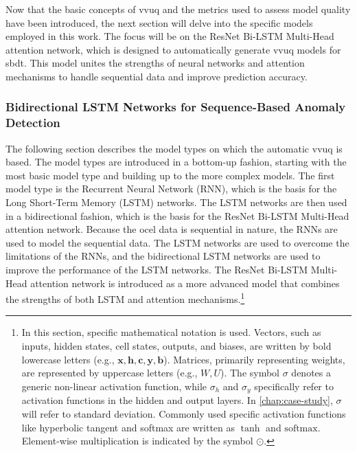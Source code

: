 Now that the basic concepts of \gls{vvuq} and the metrics used to assess model quality have been introduced, the next section will delve into the specific models employed in this work. The focus will be on the ResNet Bi-LSTM Multi-Head attention network, which is designed to automatically generate \gls{vvuq} models for \gls{sbdt}. This model unites the strengths of neural networks and attention mechanisms to handle sequential data and improve prediction accuracy.

\subsubsection*{Bidirectional LSTM Networks for Sequence-Based Anomaly Detection}

The following section describes the model types on which the automatic \gls{vvuq} is based. The model types are introduced in a bottom-up fashion, starting with the most basic model type and building up to the more complex models.
The first model type is the Recurrent Neural Network (RNN), which is the basis for the Long Short-Term Memory (LSTM) networks. The LSTM networks are then used in a bidirectional fashion, which is the basis for the ResNet Bi-LSTM Multi-Head attention network. Because the \gls{ocel} data is sequential in nature, the RNNs are used to model the sequential data. The LSTM networks are used to overcome the limitations of the RNNs, and the bidirectional LSTM networks are used to improve the performance of the LSTM networks. The ResNet Bi-LSTM Multi-Head attention network is introduced as a more advanced model that combines the strengths of both LSTM and attention mechanisms.\footnote{In this section, specific mathematical notation is used. Vectors, such as inputs, hidden states, cell states, outputs, and biases, are written by bold lowercase letters (e.g., \( \bm{x}, \bm{h}, \bm{c}, \bm{y}, \bm{b} \)). Matrices, primarily representing weights, are represented by uppercase letters (e.g., \( W, U \)). The symbol \( \sigma \) denotes a generic non-linear activation function, while \( \sigma_h \) and \( \sigma_y \) specifically refer to activation functions in the hidden and output layers. In \autoref{chap:case-study}, \( \sigma \) will refer to standard deviation. Commonly used specific activation functions like hyperbolic tangent and softmax are written as \( \tanh \) and \( \text{softmax} \). Element-wise multiplication is indicated by the symbol \( \odot \).}

